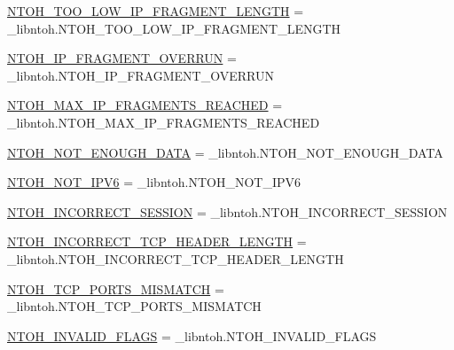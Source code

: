 \begin{DoxyCompactItemize}
\item 
\hyperlink{namespacelibntoh_a774b55926352f1c442551c035715c86c}{N\-T\-O\-H\-\_\-\-T\-O\-O\-\_\-\-L\-O\-W\-\_\-\-I\-P\-\_\-\-F\-R\-A\-G\-M\-E\-N\-T\-\_\-\-L\-E\-N\-G\-T\-H} = \-\_\-libntoh.\-N\-T\-O\-H\-\_\-\-T\-O\-O\-\_\-\-L\-O\-W\-\_\-\-I\-P\-\_\-\-F\-R\-A\-G\-M\-E\-N\-T\-\_\-\-L\-E\-N\-G\-T\-H
\item 
\hyperlink{namespacelibntoh_aaf3c244cf99447fdc8329987a0d16a17}{N\-T\-O\-H\-\_\-\-I\-P\-\_\-\-F\-R\-A\-G\-M\-E\-N\-T\-\_\-\-O\-V\-E\-R\-R\-U\-N} = \-\_\-libntoh.\-N\-T\-O\-H\-\_\-\-I\-P\-\_\-\-F\-R\-A\-G\-M\-E\-N\-T\-\_\-\-O\-V\-E\-R\-R\-U\-N
\item 
\hyperlink{namespacelibntoh_a44a4b82e773d2d3eba442ef90567fc73}{N\-T\-O\-H\-\_\-\-M\-A\-X\-\_\-\-I\-P\-\_\-\-F\-R\-A\-G\-M\-E\-N\-T\-S\-\_\-\-R\-E\-A\-C\-H\-E\-D} = \-\_\-libntoh.\-N\-T\-O\-H\-\_\-\-M\-A\-X\-\_\-\-I\-P\-\_\-\-F\-R\-A\-G\-M\-E\-N\-T\-S\-\_\-\-R\-E\-A\-C\-H\-E\-D
\item 
\hyperlink{namespacelibntoh_a7ae6c420ccf72f5dc70cf441f7b4616c}{N\-T\-O\-H\-\_\-\-N\-O\-T\-\_\-\-E\-N\-O\-U\-G\-H\-\_\-\-D\-A\-T\-A} = \-\_\-libntoh.\-N\-T\-O\-H\-\_\-\-N\-O\-T\-\_\-\-E\-N\-O\-U\-G\-H\-\_\-\-D\-A\-T\-A
\item 
\hyperlink{namespacelibntoh_a9834d87ce7d2abfffa40699c4dc01d25}{N\-T\-O\-H\-\_\-\-N\-O\-T\-\_\-\-I\-P\-V6} = \-\_\-libntoh.\-N\-T\-O\-H\-\_\-\-N\-O\-T\-\_\-\-I\-P\-V6
\item 
\hyperlink{namespacelibntoh_a7717207834f88e09c08b19d2ce2d1112}{N\-T\-O\-H\-\_\-\-I\-N\-C\-O\-R\-R\-E\-C\-T\-\_\-\-S\-E\-S\-S\-I\-O\-N} = \-\_\-libntoh.\-N\-T\-O\-H\-\_\-\-I\-N\-C\-O\-R\-R\-E\-C\-T\-\_\-\-S\-E\-S\-S\-I\-O\-N
\item 
\hyperlink{namespacelibntoh_a4a2e6ed3483c83474573feb5acc7e617}{N\-T\-O\-H\-\_\-\-I\-N\-C\-O\-R\-R\-E\-C\-T\-\_\-\-T\-C\-P\-\_\-\-H\-E\-A\-D\-E\-R\-\_\-\-L\-E\-N\-G\-T\-H} = \-\_\-libntoh.\-N\-T\-O\-H\-\_\-\-I\-N\-C\-O\-R\-R\-E\-C\-T\-\_\-\-T\-C\-P\-\_\-\-H\-E\-A\-D\-E\-R\-\_\-\-L\-E\-N\-G\-T\-H
\item 
\hyperlink{namespacelibntoh_a729c9e41100fc15cbe74c29a40ce6fa4}{N\-T\-O\-H\-\_\-\-T\-C\-P\-\_\-\-P\-O\-R\-T\-S\-\_\-\-M\-I\-S\-M\-A\-T\-C\-H} = \-\_\-libntoh.\-N\-T\-O\-H\-\_\-\-T\-C\-P\-\_\-\-P\-O\-R\-T\-S\-\_\-\-M\-I\-S\-M\-A\-T\-C\-H
\item 
\hyperlink{namespacelibntoh_a809f60818fc236fe7253b6bf5533cd6f}{N\-T\-O\-H\-\_\-\-I\-N\-V\-A\-L\-I\-D\-\_\-\-F\-L\-A\-G\-S} = \-\_\-libntoh.\-N\-T\-O\-H\-\_\-\-I\-N\-V\-A\-L\-I\-D\-\_\-\-F\-L\-A\-G\-S
\item 

\end{DoxyCompactItemize}

